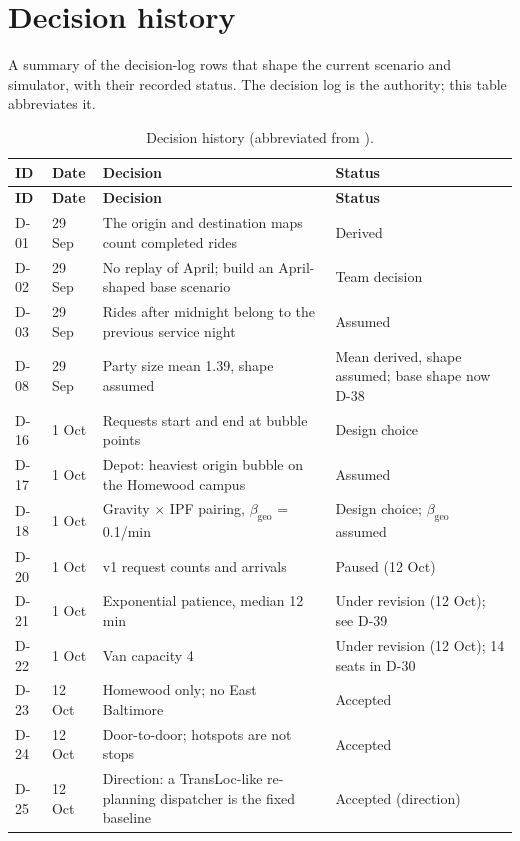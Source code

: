 \documentclass[11pt,letterpaper]{article}
\DeclareRobustCommand{\fn}[1]{\texttt{\detokenize{#1}}}
\begin{document}
\section{Decision history}\label{app:decisions}
A summary of the decision-log rows that shape the current scenario and simulator, with their recorded status. The decision log is the authority; this table abbreviates it.

{\small
\begin{longtable}{@{}P{1.25cm}P{1.45cm}P{8.0cm}P{3.0cm}@{}}
\caption[Decision history]{Decision history (abbreviated from \fn{decision_log.md}).}\label{tab:decisions}\\
\toprule
\textbf{ID} & \textbf{Date} & \textbf{Decision} & \textbf{Status}\\
\midrule
\endfirsthead
\toprule
\textbf{ID} & \textbf{Date} & \textbf{Decision} & \textbf{Status}\\
\midrule
\endhead
\bottomrule
\endfoot
D-01 & 29 Sep & The origin and destination maps count completed rides & Derived\\
D-02 & 29 Sep & No replay of April; build an April-shaped base scenario & Team decision\\
D-03 & 29 Sep & Rides after midnight belong to the previous service night & Assumed\\
D-08 & 29 Sep & Party size mean 1.39, shape assumed & Mean derived, shape assumed; base shape now D-38\\
D-16 & 1 Oct & Requests start and end at bubble points & Design choice\\
D-17 & 1 Oct & Depot: heaviest origin bubble on the Homewood campus & Assumed\\
D-18 & 1 Oct & Gravity $\times$ IPF pairing, $\beta_{\text{geo}}$ = 0.1/min & Design choice; $\beta_{\text{geo}}$ assumed\\
D-20 & 1 Oct & v1 request counts and arrivals & Paused (12 Oct)\\
D-21 & 1 Oct & Exponential patience, median 12 min & Under revision (12 Oct); see D-39\\
D-22 & 1 Oct & Van capacity 4 & Under revision (12 Oct); 14 seats in D-30\\
D-23 & 12 Oct & Homewood only; no East Baltimore & Accepted\\
D-24 & 12 Oct & Door-to-door; hotspots are not stops & Accepted\\
D-25 & 12 Oct & Direction: a TransLoc-like re-planning dispatcher is the fixed baseline & Accepted (direction)\\

\end{longtable}}
\end{document}
